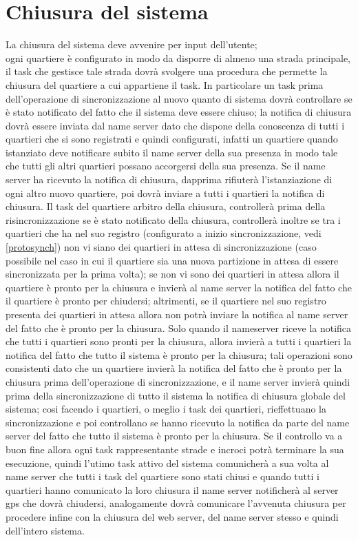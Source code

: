 \section{Chiusura del sistema}
La chiusura del sistema deve avvenire per input dell'utente;\\
ogni quartiere è configurato in modo da disporre di almeno una strada principale, il task che gestisce tale strada dovrà svolgere una procedura che permette la chiusura del quartiere a cui appartiene il task. In particolare un task prima dell'operazione di sincronizzazione al nuovo quanto di sistema dovrà controllare se è stato notificato del fatto che il sistema deve essere chiuso; la notifica di chiusura dovrà essere inviata dal name server dato che dispone della conoscenza di tutti i quartieri che si sono registrati e quindi configurati, infatti un quartiere quando istanziato deve notificare subito il name server della sua presenza in modo tale che tutti gli altri quartieri possano accorgersi della sua presenza. Se il name server ha ricevuto la notifica di chiusura, dapprima rifiuterà l'istanziazione di ogni altro nuovo quartiere, poi dovrà inviare a tutti i quartieri la notifica di chiusura. Il task del quartiere arbitro della chiusura, controllerà prima della risincronizzazione se è stato notificato della chiusura, controllerà inoltre se tra i quartieri che ha nel suo registro (configurato a inizio sincronizzazione, vedi \ref{protosynch}) non vi siano dei quartieri in attesa di sincronizzazione (caso possibile nel caso in cui il quartiere sia una nuova partizione in attesa di essere sincronizzata per la prima volta); se non vi sono dei quartieri in attesa allora il quartiere è pronto per la chiusura e invierà al name server la notifica del fatto che il quartiere è pronto per chiudersi; altrimenti, se il quartiere nel suo registro presenta dei quartieri in attesa allora non potrà inviare la notifica al name server del fatto che è pronto per la chiusura. Solo  quando il nameserver riceve la notifica che tutti i quartieri sono pronti per la chiusura, allora invierà a tutti i quartieri la notifica del fatto che tutto il sistema è pronto per la chiusura; tali operazioni sono consistenti dato che un quartiere invierà la notifica del fatto che è pronto per la chiusura prima dell'operazione di sincronizzazione, e il name server invierà quindi prima della sincronizzazione di tutto il sistema la notifica di chiusura globale del sistema; cosi facendo i quartieri, o meglio i task dei quartieri, rieffettuano la sincronizzazione e poi controllano se hanno ricevuto la notifica da parte del name server del fatto che tutto il sistema è pronto per la chiusura. Se il controllo va a buon fine allora ogni task rappresentante strade e incroci potrà terminare la sua esecuzione, quindi l'utimo task attivo del sistema comunicherà a sua volta al name server che tutti i task del quartiere sono stati chiusi e quando tutti i quartieri hanno comunicato la loro chiusura il name server notificherà al server gps che dovrà chiudersi, analogamente dovrà comunicare l'avvenuta chiusura per procedere infine con la chiusura del web server, del name server stesso e quindi dell'intero sistema.